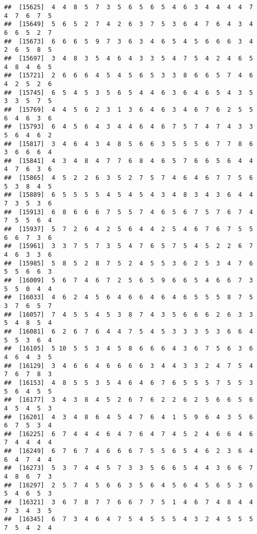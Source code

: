 \documentclass[
]{book}
\begin{document}
\begin{verbatim}
##  [15625]  4  4  8  5  7  3  5  6  5  6  5  4  6  3  4  4  4  4  7  4  7  6  7  5
##  [15649]  5  6  5  2  7  4  2  6  3  7  5  3  6  4  7  6  4  3  4  6  6  5  2  7
##  [15673]  6  6  6  5  9  7  3  6  3  4  6  5  4  5  6  6  6  3  4  2  6  5  8  5
##  [15697]  3  4  8  3  5  4  6  4  3  3  5  4  7  5  4  2  4  6  5  4  8  4  6  5
##  [15721]  2  6  6  6  4  5  4  5  6  5  3  3  8  6  6  5  7  4  6  4  2  5  2  6
##  [15745]  6  5  4  5  3  5  6  5  4  4  6  3  6  4  6  5  4  3  5  3  3  5  7  5
##  [15769]  4  4  5  6  2  3  1  3  6  4  6  3  4  6  7  6  2  5  5  6  4  6  3  6
##  [15793]  6  4  5  6  4  3  4  4  6  4  6  7  5  7  4  7  4  3  3  5  6  4  6  2
##  [15817]  3  4  6  4  3  4  8  5  6  6  3  5  5  5  6  7  7  8  6  3  6  6  6  4
##  [15841]  4  3  4  8  4  7  7  6  8  4  6  5  7  6  6  5  6  4  4  4  7  6  3  6
##  [15865]  4  5  2  2  6  3  5  2  7  5  7  4  6  4  6  7  7  5  6  5  3  8  4  5
##  [15889]  6  5  5  5  5  4  5  4  5  4  3  4  8  3  4  3  6  4  4  7  3  5  3  6
##  [15913]  6  8  6  6  6  7  5  5  7  4  6  5  6  7  5  7  6  7  4  7  5  5  6  4
##  [15937]  5  7  2  6  4  2  5  6  4  4  2  5  4  6  7  6  7  5  5  6  6  7  3  6
##  [15961]  3  3  7  5  7  3  5  4  7  6  5  7  5  4  5  2  2  6  7  4  6  3  3  6
##  [15985]  5  8  5  2  8  7  5  2  4  5  5  3  6  2  5  3  4  7  6  5  5  6  6  3
##  [16009]  5  6  7  4  6  7  2  5  6  5  9  6  6  5  4  6  6  7  3  5  5  0  4  4
##  [16033]  4  6  2  4  5  6  4  6  6  4  6  4  6  5  5  5  8  7  5  3  7  6  5  7
##  [16057]  7  4  5  5  4  5  3  8  7  4  3  5  6  6  6  2  6  3  3  5  4  8  5  4
##  [16081]  6  2  6  7  6  4  4  7  5  4  5  3  3  3  5  3  6  6  4  5  5  3  6  4
##  [16105]  5 10  5  5  3  4  5  8  6  6  6  4  3  6  7  5  6  3  6  4  6  4  3  5
##  [16129]  3  4  6  6  4  6  6  6  6  3  4  4  3  3  2  4  7  5  4  7  6  7  8  3
##  [16153]  4  8  5  5  3  5  4  6  4  6  7  6  5  5  5  7  5  5  3  5  6  4  5  5
##  [16177]  3  4  3  8  4  5  2  6  7  6  2  2  6  2  5  6  6  5  6  4  5  4  5  3
##  [16201]  4  3  4  8  6  4  5  4  7  6  4  1  5  9  6  4  3  5  6  6  7  5  3  4
##  [16225]  6  7  4  4  4  6  4  7  6  4  7  4  5  2  4  6  6  4  6  7  4  4  4  4
##  [16249]  6  7  6  7  4  6  6  6  7  5  5  6  5  4  6  2  3  6  4  6  4  7  4  4
##  [16273]  5  3  7  4  4  5  7  3  3  5  6  6  5  4  4  3  6  6  7  4  8  6  7  3
##  [16297]  2  5  7  4  5  6  6  3  5  6  4  5  6  4  5  6  5  3  6  5  4  6  5  3
##  [16321]  3  6  7  8  7  7  6  6  7  7  5  1  4  6  7  4  8  4  4  7  3  4  3  5
##  [16345]  6  7  3  4  6  4  7  5  4  5  5  5  4  3  2  4  5  5  5  7  5  4  2  4

\end{verbatim}
\end{document}
